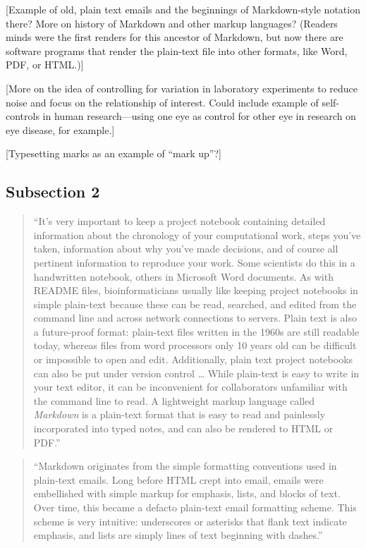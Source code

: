 \documentclass[]{tufte-book}
\begin{document}
{[}Example of old, plain text emails and the beginnings of Markdown-style notation
there? More on history of Markdown and other markup languages? (Readers minds were the
first renders for this ancestor of Markdown, but now there are software programs
that render the plain-text file into other formats, like Word, PDF, or HTML.){]}

{[}More on the idea of controlling for variation in laboratory experiments to reduce
noise and focus on the relationship of interest. Could include example of self-controls
in human research---using one eye as control for other eye in research on
eye disease, for example.{]}

{[}Typesetting marks as an example of ``mark up''?{]}

\hypertarget{subsection-2}{%
\subsection{Subsection 2}\label{subsection-2}}

\begin{quote}
``It's very important to keep a project notebook containing detailed information
about the chronology of your computational work, steps you've taken, information
about why you've made decisions, and of course all pertinent information to
reproduce your work. Some scientists do this in a handwritten notebook, others in
Microsoft Word documents. As with README files, bioinformaticians usually like keeping
project notebooks in simple plain-text because these can be read, searched, and
edited from the command line and across network connections to servers. Plain text
is also a future-proof format: plain-text files written in the 1960s are still
readable today, whereas files from word processors only 10 years old can be
difficult or impossible to open and edit. Additionally, plain text project notebooks can
also be put under version control \ldots{} While plain-text is easy to write in your
text editor, it can be inconvenient for collaborators unfamiliar with the command
line to read. A lightweight markup language called \emph{Markdown} is a plain-text format
that is easy to read and painlessly incorporated into typed notes, and can also be
rendered to HTML or PDF.'' \citep{buffalo2015bioinformatics}
\end{quote}

\begin{quote}
``Markdown originates from the simple formatting conventions used in plain-text
emails. Long before HTML crept into email, emails were embellished with simple
markup for emphasis, lists, and blocks of text. Over time, this became a defacto
plain-text email formatting scheme. This scheme is very intuitive: underscores or
asterisks that flank text indicate emphasis, and lists are simply lines of text
beginning with dashes.'' \citep{buffalo2015bioinformatics}
\end{quote}
\end{document}
